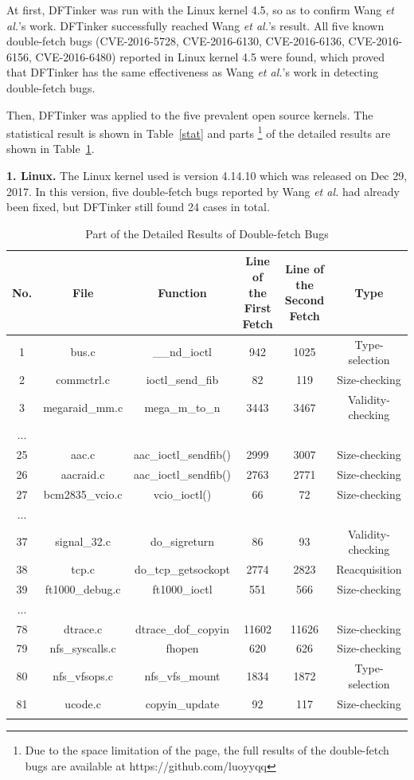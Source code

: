 \documentclass[10pt]{llncs}
\begin{document}
At first, DFTinker was run with the Linux kernel 4.5, so as to confirm Wang \textit{et al.}'s work. DFTinker successfully reached Wang \textit{et al.}'s result. All five known double-fetch bugs (CVE-2016-5728, CVE-2016-6130, CVE-2016-6136, CVE-2016-6156, CVE-2016-6480)
reported in Linux kernel 4.5 were found, which proved that DFTinker has the same effectiveness as Wang
\textit{et al.}'s work in detecting double-fetch bugs.


Then, DFTinker was applied to the five prevalent open source kernels. The statistical result is shown in Table~\ref{stat} and parts
\footnote{Due to the space limitation of the page, the full results of the double-fetch bugs are available at https://github.com/luoyyqq}​ of the detailed results are shown in Table~\ref{result}.

\textbf{1. Linux.} The Linux kernel used is version 4.14.10 which was released on Dec 29, 2017. In this version, five double-fetch bugs reported by Wang \textit{et al.} had already been fixed, but DFTinker still found 24 cases in total.

\begin{table}[htb!]
  \centering
  \caption{Part of the Detailed Results of Double-fetch Bugs}
  \begin{tabular}{cccccc}
    \hline
    No. & File & Function & \makecell{Line of the\\First Fetch} & \makecell{Line of the\\Second Fetch}  & Type  \\  
    \hline
    1 & bus.c & \_\_nd\_ioctl & 942 & 1025 & Type-selection \\
2 & commctrl.c & ioctl\_send\_fib & 82 & 119 & Size-checking \\
3 & megaraid\_mm.c & mega\_m\_to\_n & 3443 & 3467 & Validity-checking \\
	...\\ 
	\hline
25 & aac.c  & aac\_ioctl\_sendfib() & 2999 & 3007 & Size-checking \\
26 & aacraid.c  & aac\_ioctl\_sendfib() & 2763 & 2771 & Size-checking \\
27 & bcm2835\_vcio.c  & vcio\_ioctl() & 66 & 72 & Size-checking \\
...\\
\hline
37 & signal\_32.c & do\_sigreturn & 86 & 93 & Validity-checking \\
38 & tcp.c & do\_tcp\_getsockopt & 2774 & 2823 & Reacquisition \\
39 & ft1000\_debug.c & ft1000\_ioctl & 551 & 566 & Size-checking \\
...\\
	\hline
78 & dtrace.c & dtrace\_dof\_copyin & 11602 & 11626 & Size-checking \\
79 & nfs\_syscalls.c & fhopen & 620 & 626 & Size-checking \\
80 & nfs\_vfsops.c & nfs\_vfs\_mount & 1834 & 1872 & Type-selection \\
81 & ucode.c & copyin\_update & 92 & 117 & Size-checking \\
\hline
    \label{result}
  \end{tabular}
\end{table}
\end{document}
